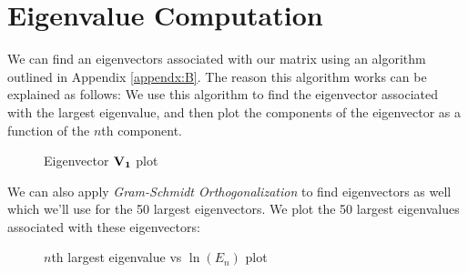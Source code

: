 \documentclass[letterpaper,12pt]{article}
\begin{document}
\section{Eigenvalue Computation}
We can find an eigenvectors associated with our matrix using an algorithm outlined in Appendix \ref{appendx:B}.
The reason this algorithm works can be explained as follows:
We use this algorithm to find the eigenvector associated with the largest eigenvalue, and then plot the components of the eigenvector as a function of the \(n\)th component.
\begin{figure}[H]
    \centering
    
    \caption{Eigenvector \(\vb{V_1}\) plot}
    \label{fig:2}
\end{figure}
We can also apply \textit{Gram-Schmidt Orthogonalization} to find eigenvectors as well which we'll use for the 50 largest eigenvectors. 
We plot the 50 largest eigenvalues associated with these eigenvectors:
\begin{figure}[H]
    \centering
    
    \caption{\(n\)th largest eigenvalue vs \(\ln(E_n)\) plot}
    \label{fig:3}
\end{figure}
\end{document}
